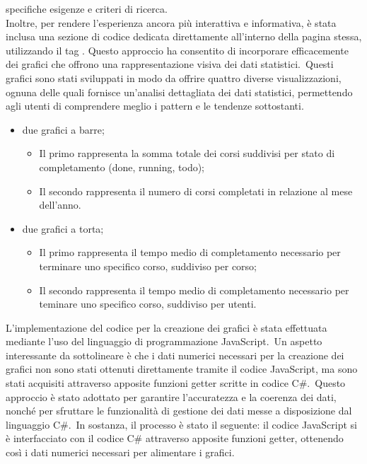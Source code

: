 specifiche esigenze e criteri di ricerca.
\\
Inoltre, per rendere l'esperienza ancora più interattiva e informativa, è stata inclusa una sezione di codice dedicata 
direttamente all'interno della pagina stessa, utilizzando il tag . Questo approccio ha 
consentito di incorporare efficacemente dei grafici che offrono una rappresentazione visiva dei dati statistici.\ 
Questi grafici sono stati sviluppati in modo da offrire quattro diverse visualizzazioni, ognuna delle quali fornisce un'analisi 
dettagliata dei dati statistici, permettendo agli utenti di comprendere meglio i pattern e le tendenze sottostanti.
\begin{itemize}
	\item due grafici a barre;
	\begin{itemize}
		\item Il primo rappresenta la somma totale dei corsi suddivisi per stato di completamento (done, running, todo);
		\item Il secondo rappresenta il numero di corsi completati in relazione al mese dell'anno.
	\end{itemize}
	\item due grafici a torta;
	\begin{itemize}
		\item Il primo rappresenta il tempo medio di completamento necessario per terminare uno specifico corso, suddiviso per corso;
		\item Il secondo rappresenta il tempo medio di completamento necessario per teminare uno specifico corso, suddiviso per utenti.
	\end{itemize}
\end{itemize}
L'implementazione del codice per la creazione dei grafici è stata effettuata mediante l'uso del linguaggio di programmazione JavaScript.\ 
Un aspetto interessante da sottolineare è che i dati numerici necessari per la creazione dei grafici non sono stati ottenuti direttamente 
tramite il codice JavaScript, ma sono stati acquisiti attraverso apposite funzioni getter scritte in codice C\#.\ 
Questo approccio è stato adottato per garantire l'accuratezza e la coerenza dei dati, nonché per sfruttare le funzionalità di gestione 
dei dati messe a disposizione dal linguaggio C\#.\
In sostanza, il processo è stato il seguente: il codice JavaScript si è interfacciato con il codice C\# attraverso apposite funzioni getter, 
ottenendo così i dati numerici necessari per alimentare i grafici.\
